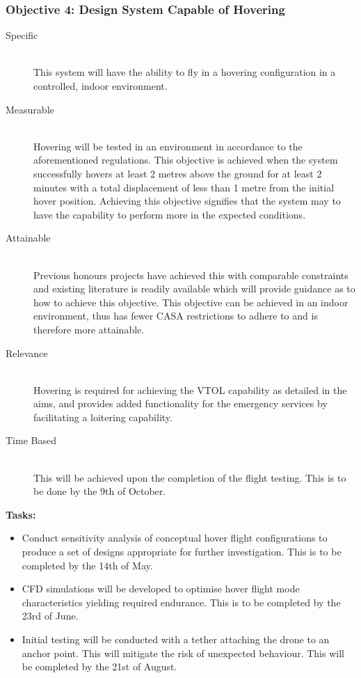 \begin{appendices}
\subsubsection{Objective 4: Design System Capable of Hovering}

\begin{description}
    \item[Specific] \hfill \\
    This system will have the ability to fly in a hovering configuration in a controlled, indoor environment.
    \item[Measurable] \hfill \\
    Hovering will be tested in an environment in accordance to the aforementioned regulations. This objective is achieved when the system successfully hovers at least 2 metres above the ground for at least 2 minutes with a total displacement of less than 1 metre from the initial hover position. Achieving this objective signifies that the system may to have the capability to perform more in the expected conditions.
    \item[Attainable] \hfill \\
    Previous honours projects have achieved this with comparable constraints and existing literature is readily available which will provide guidance as to how to achieve this objective. This objective can be achieved in an indoor environment, thus has fewer CASA restrictions to adhere to and is therefore more attainable.
    \item[Relevance] \hfill \\
    Hovering is required for achieving the VTOL capability as detailed in the aims, and provides added functionality for the emergency services by facilitating a loitering capability.
    \item[Time Based] \hfill \\
    This will be achieved upon the completion of the flight testing. This is to be done by the 9th of October.
\end{description}

\textbf{Tasks:}
\begin{itemize}
    \item Conduct sensitivity analysis of conceptual hover flight configurations to produce a set of designs appropriate for further investigation. This is to be completed by the 14th of May.
    \item CFD simulations will be developed to optimise hover flight mode characteristics yielding required endurance. This is to be completed by the 23rd of June.
    \item Initial testing will be conducted with a tether attaching the drone to an anchor point. This will mitigate the risk of unexpected behaviour. This will be completed by the 21st of August.
\end{itemize}


\end{appendices}
